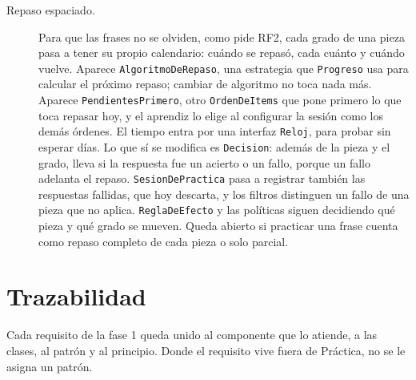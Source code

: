 \documentclass[11pt]{article}
\begin{document}
\begin{description}
  \item[Repaso espaciado.] Para que las frases no se olviden, como pide RF2, cada grado de una pieza pasa a tener su propio calendario: cuándo se repasó, cada cuánto y cuándo vuelve. Aparece \texttt{AlgoritmoDeRepaso}, una estrategia que \texttt{Progreso} usa para calcular el próximo repaso; cambiar de algoritmo no toca nada más. Aparece \texttt{PendientesPrimero}, otro \texttt{OrdenDeItems} que pone primero lo que toca repasar hoy, y el aprendiz lo elige al configurar la sesión como los demás órdenes. El tiempo entra por una interfaz \texttt{Reloj}, para probar sin esperar días. Lo que sí se modifica es \texttt{Decision}: además de la pieza y el grado, lleva si la respuesta fue un acierto o un fallo, porque un fallo adelanta el repaso. \texttt{SesionDePractica} pasa a registrar también las respuestas fallidas, que hoy descarta, y los filtros distinguen un fallo de una pieza que no aplica. \texttt{ReglaDeEfecto} y las políticas siguen decidiendo qué pieza y qué grado se mueven. Queda abierto si practicar una frase cuenta como repaso completo de cada pieza o solo parcial.
\end{description}

\section{Trazabilidad}

Cada requisito de la fase 1 queda unido al componente que lo atiende, a las clases, al patrón y al principio. Donde el requisito vive fuera de Práctica, no se le asigna un patrón.
\end{document}
